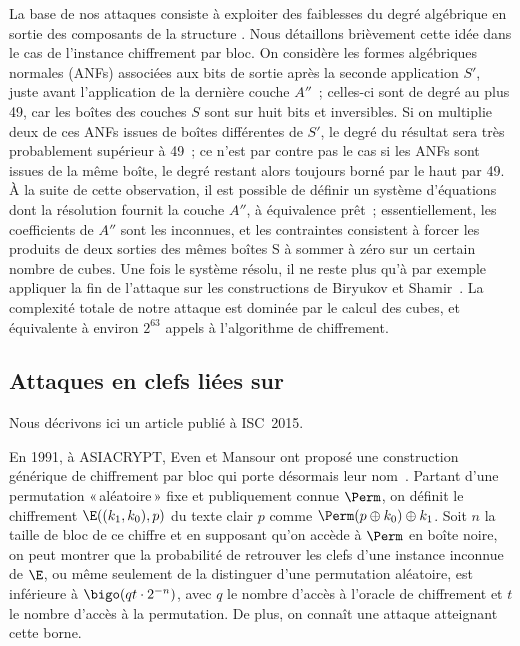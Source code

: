 La base de nos attaques consiste à exploiter des faiblesses du degré algébrique en sortie des composants de la structure \asasa. Nous détaillons brièvement cette idée dans le cas de l'instance
chiffrement par bloc. On considère les formes algébriques normales (ANFs) associées aux bits de sortie après la seconde application $S'$,
juste avant l'application de la dernière couche $A''$~;
celles-ci sont de degré au plus 49, car les boîtes des couches $S$ sont sur huit bits et inversibles. Si on multiplie deux de ces ANFs issues de boîtes différentes de $S'$, le degré du résultat
sera très probablement supérieur à 49~; ce n'est par contre pas le cas si les ANFs sont issues de la même boîte, le degré restant alors toujours borné par le haut par 49.
À la suite de cette observation, il est possible de définir un système d'équations dont la résolution fournit la couche $A''$, à équivalence prêt~;
essentiellement,
les coefficients de $A''$ sont les inconnues, et les contraintes consistent à forcer les produits de deux sorties des mêmes boîtes S à sommer à zéro sur un certain nombre de cubes. Une fois le système résolu, il ne reste plus qu'à par exemple
appliquer la fin de l'attaque sur les constructions \sasas de Biryukov et Shamir~\cite{DBLP:conf/eurocrypt/BiryukovS01}. La complexité totale de notre attaque est dominée par le calcul
des cubes, et équivalente à environ $2^{63}$ appels à l'algorithme de chiffrement.

\subsection{Attaques en clefs liées sur \proestotr \cite{DBLP:conf/isw/Karpman15}}

Nous décrivons ici un article publié à ISC~2015.

\medskip

En 1991, à ASIACRYPT, Even et Mansour ont proposé une construction générique de chiffrement par bloc qui porte désormais leur nom~\cite{EM}. Partant d'une permutation «\,aléatoire\,» fixe
et publiquement connue $\Perm$, on définit le chiffrement $\E((k_1,k_0),p)$ du texte clair $p$ comme $\Perm(p \oplus k_0) \oplus k_1$. Soit $n$ la taille de bloc de ce chiffre
et en supposant qu'on accède à $\Perm$ en boîte noire, on peut montrer que la probabilité de retrouver les clefs d'une instance inconnue de $\E$,
ou même seulement de la distinguer d'une permutation aléatoire, est inférieure à
$\bigo(qt \cdot 2^{-n})$, avec $q$ le nombre d'accès à l'oracle de chiffrement et $t$ le nombre d'accès à la permutation. De plus, on connaît une attaque atteignant cette borne.

